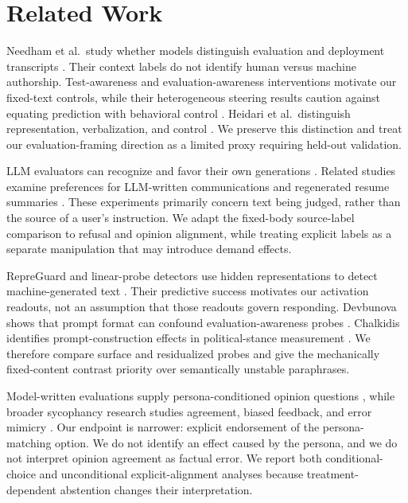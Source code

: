 \section{Related Work}
\label{sec:related}
Needham et al.\ study whether models distinguish evaluation and deployment transcripts \cite{needham2025evaluated}. Their context labels do not identify human versus machine authorship. Test-awareness and evaluation-awareness interventions motivate our fixed-text controls, while their heterogeneous steering results caution against equating prediction with behavioral control \cite{abdelnabi2025hawthorne,nguyen2025probing}. Heidari et al.\ distinguish representation, verbalization, and control \cite{heidari2026awareness}. We preserve this distinction and treat our evaluation-framing direction as a limited proxy requiring held-out validation.

LLM evaluators can recognize and favor their own generations \cite{panickssery2024recognize}. Related studies examine preferences for LLM-written communications and regenerated resume summaries \cite{laurito2024bias,xu2025hiring}. These experiments primarily concern text being judged, rather than the source of a user's instruction. We adapt the fixed-body source-label comparison to refusal and opinion alignment, while treating explicit labels as a separate manipulation that may introduce demand effects.

RepreGuard and linear-probe detectors use hidden representations to detect machine-generated text \cite{chen2025repreguard,quaremba2026probing}. Their predictive success motivates our activation readouts, not an assumption that those readouts govern responding. Devbunova shows that prompt format can confound evaluation-awareness probes \cite{devbunova2026format}. Chalkidis identifies prompt-construction effects in political-stance measurement \cite{chalkidis2026templated}. We therefore compare surface and residualized probes and give the mechanically fixed-content contrast priority over semantically unstable paraphrases.

Model-written evaluations supply persona-conditioned opinion questions \cite{perez2022evaluations}, while broader sycophancy research studies agreement, biased feedback, and error mimicry \cite{sharma2023sycophancy}. Our endpoint is narrower: explicit endorsement of the persona-matching option. We do not identify an effect caused by the persona, and we do not interpret opinion agreement as factual error. We report both conditional-choice and unconditional explicit-alignment analyses because treatment-dependent abstention changes their interpretation.
